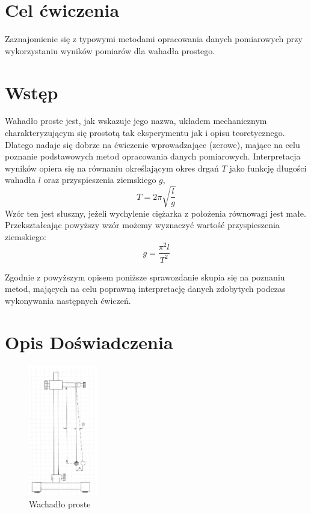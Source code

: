 \documentclass{fizraport}
\begin{document}
\maketitle

\section{Cel ćwiczenia}
Zaznajomienie się z typowymi metodami opracowania danych pomiarowych
przy wykorzystaniu wyników pomiarów dla wahadła prostego.

\section{Wstęp}
Wahadło proste jest, jak wskazuje jego nazwa, układem mechanicznym charakteryzującym się prostotą tak  eksperymentu  jak  i  opisu  teoretycznego.
Dlatego nadaje  się dobrze  na ćwiczenie  wprowadzające (zerowe),   mające   na   celu   poznanie   podstawowych   metod   opracowania danych   pomiarowych.
Interpretacja  wyników  opiera  się na  równaniu  określającym  okres  drgań $T$ jako  funkcję długości wahadła $l$ oraz przyspieszenia ziemskiego $g$, 
%
\[ T = 2\pi \sqrt{\frac{l}{g}} \]
%
Wzór ten jest słuszny, jeżeli wychylenie ciężarka z położenia równowagi jest małe.  
Przekształcając powyższy wzór możemy wyznaczyć wartość przyspieszenia ziemskiego:
%
\[ g = \frac{\pi^2l}{T^2} \]

Zgodnie z powyższym opisem poniższe sprawozdanie skupia się na poznaniu metod,
mających na celu poprawną interpretację danych zdobytych podczas wykonywania następnych ćwiczeń.

\section{Opis Doświadczenia}

\begin{figure}
 \centering
 \includegraphics[width=0.27\textwidth,keepaspectratio=true]{wahadlo1.png}
 \caption{Wachadło proste}
 \label{fig:w1}
\end{figure}
\end{document}
